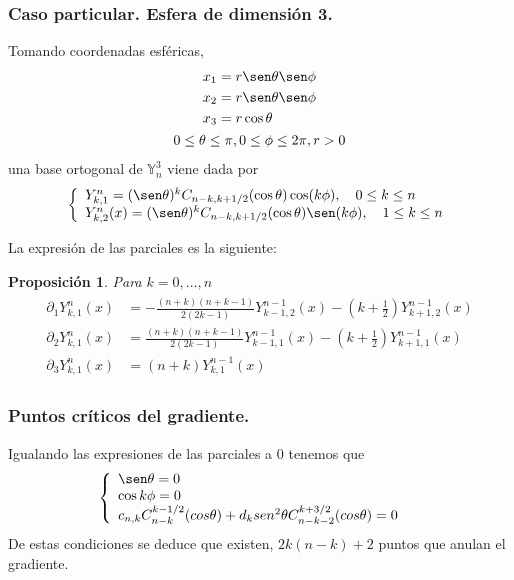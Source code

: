 \documentclass{beamer}
\theoremstyle{plain}
\theoremstyle{definition}
\theoremstyle{plain}
\newtheorem{prop}[thm]{Proposici\'{o}n}
\theoremstyle{definition}
\theoremstyle{remark}
\theoremstyle{definition}
\begin{document}
\begin{frame}
		\frametitle{Caso particular. Esfera de dimensión 3.}
		Tomando coordenadas esféricas,
		\begin{gather*}
		\begin{aligned}
		x_1 &= r \sen \theta \sen \phi\\
		x_2 &= r \sen \theta \sen \phi\\
		x_3 &= r \cos \theta\\
		\end{aligned}
		\\
		0\le \theta \le \pi,0\le\phi\le2\pi,r>0
		\end{gather*}
		una base ortogonal de $\mathds{Y}_n^3$ viene dada por
		\begin{equation*}
		\left\lbrace
		\begin{array}{ll}
		Y^n_ {k,1} = (\sen \theta)^kC_{n-k,k+1/2}(\cos \theta) \cos(k\phi),\quad 0\le k\le n \\
		Y^n_{k,2}(x) = (\sen\theta)^kC_{n-k,k+1/2}(\cos\theta)\sen(k\phi), \quad 1\le k\le n
		\end{array}
		\right.
		\end{equation*}
\end{frame}
\begin{frame}
La expresión de las parciales es la siguiente:
	\begin{prop} Para $k=0,...,n$
		\begin{gather*} 
		\begin{aligned}
		\partial_1Y^{n}_{k,1}(x) &= -\frac{(n+k)(n+k-1)}{2(2k-1)}Y^{n-1}_{k-1,2}(x)-(k+\frac{1}{2})Y^{n-1}_ {k+1,2}(x) \\
		\partial_2Y^{n}_{k,1}(x) &= \frac{(n+k)(n+k-1)}{2(2k-1)}Y^{n-1}_{k-1,1}(x)-(k+\frac{1}{2})Y^{n-1}_ {k+1,1}(x) \\
		\partial_3 Y_{k,1}^{n}(x) &=(n+k)Y_{k,1}^{n-1}(x)
		\end{aligned}
		\end{gather*}

	\end{prop}
\end{frame}
\begin{frame}
	\frametitle{Puntos críticos del gradiente.}

	Igualando las expresiones de las parciales a 0 tenemos que 
	\begin{gather*}
	\left\{
	\begin{array}{ll}
	\sen \theta= 0 \\
	\cos k\phi = 0 &\\
c_{n,k}C_{n-k}^{k-1/2}(cos \theta) + d_k sen^2\theta C_{n-k-2}^{k+3/2}(cos \theta) = 0
	\end{array}
	\right.
	\end{gather*}
	De estas condiciones se deduce que existen, $2k(n-k)+2$ puntos que anulan el gradiente.
\end{frame}
\end{document}
